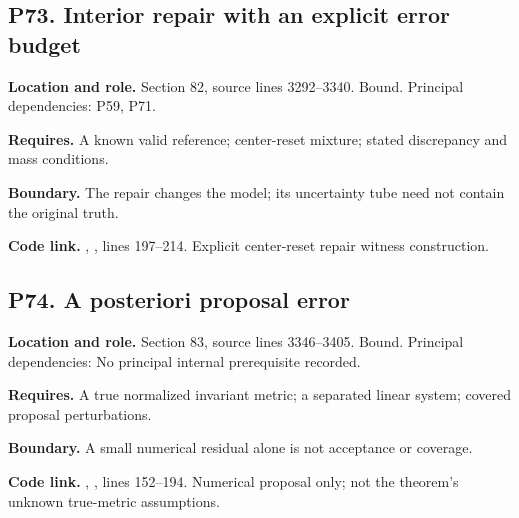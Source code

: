 \documentclass[11pt,letterpaper]{article}
\begin{document}
\par\noindent\begin{minipage}{\textwidth}
\subsection{P73. Interior repair with an explicit error
budget}\label{p73.-interior-repair-with-an-explicit-error-budget}

\textbf{Location and role.} Section 82, source lines 3292--3340. Bound.
Principal dependencies: P59, P71.

\textbf{Requires.} A known valid reference; center-reset mixture; stated
discrepancy and mass conditions.

\textbf{Boundary.} The repair changes the model; its uncertainty tube
need not contain the original truth.

\textbf{Code link.} ,
, lines 197--214. Explicit center-reset repair
witness construction.
\end{minipage}\par\medskip

\par\noindent\begin{minipage}{\textwidth}
\subsection{P74. A posteriori proposal
error}\label{p74.-a-posteriori-proposal-error}

\textbf{Location and role.} Section 83, source lines 3346--3405. Bound.
Principal dependencies: No principal internal prerequisite recorded.

\textbf{Requires.} A true normalized invariant metric; a separated
linear system; covered proposal perturbations.

\textbf{Boundary.} A small numerical residual alone is not acceptance or
coverage.

\textbf{Code link.} ,
, lines 152--194. Numerical proposal only; not
the theorem's unknown true-metric assumptions.
\end{minipage}\par\medskip
\end{document}
